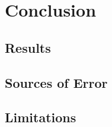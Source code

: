 \documentclass[../main.tex]{subfiles}
\begin{document}
\section{Conclusion}
\label{sec:conclusion}

\subsection{Results}
\label{ssec:results}

\subsection{Sources of Error}
\label{ssec:error}

\subsection{Limitations}
\label{ssec:limits}
\end{document}
